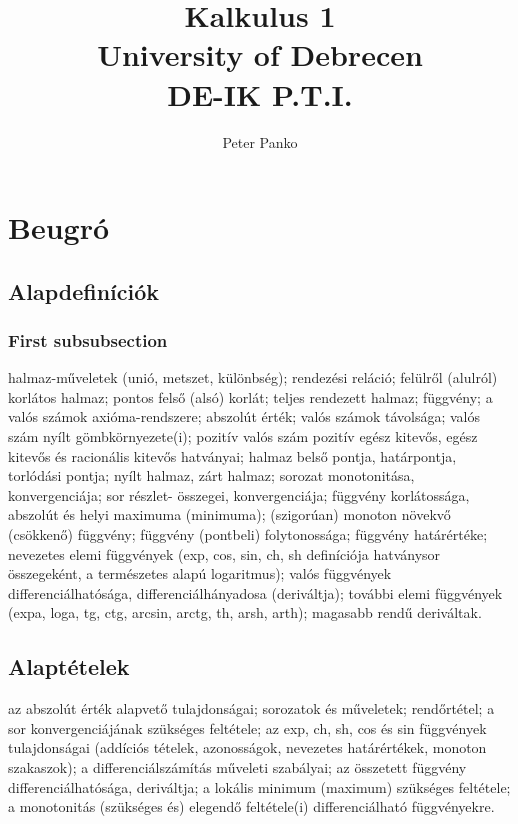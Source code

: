 \documentclass{article}
\title{\Huge Kalkulus 1 \\
\LARGE University of Debrecen \\
\large DE-IK P.T.I.}
\author{Peter Panko}
\date{ }
\begin{document}
\clearpage\maketitle
\thispagestyle{empty}

\newpage
\tableofcontents
\newpage


\section{Beugró}



\subsection{Alapdefiníciók}

\subsubsection{First subsubsection}
 
halmaz-műveletek (unió, metszet, különbség); rendezési reláció;
felülről (alulról) korlátos halmaz; pontos felső (alsó) korlát; teljes rendezett halmaz;
függvény; a valós számok axióma-rendszere; abszolút érték; valós számok távolsága;
valós szám nyílt gömbkörnyezete(i); pozitív valós szám pozitív egész kitevős, egész
kitevős és racionális kitevős hatványai; halmaz belső pontja, határpontja, torlódási
pontja; nyílt halmaz, zárt halmaz; sorozat monotonitása, konvergenciája; sor részlet-
összegei, konvergenciája; függvény korlátossága, abszolút és helyi maximuma
(minimuma); (szigorúan) monoton növekvő (csökkenő) függvény; függvény (pontbeli)
folytonossága; függvény határértéke; nevezetes elemi függvények (exp, cos, sin, ch, sh
definíciója hatványsor összegeként, a természetes alapú logaritmus); valós függvények
differenciálhatósága, differenciálhányadosa (deriváltja); további elemi függvények
(expa, loga, tg, ctg, arcsin, arctg, th, arsh, arth); magasabb rendű deriváltak.
 

 
\subsection{Alaptételek}
 
az abszolút érték alapvető tulajdonságai; sorozatok és műveletek; rendőrtétel;
a sor konvergenciájának szükséges feltétele; az exp, ch, sh, cos és sin függvények
tulajdonságai (addíciós tételek, azonosságok, nevezetes határértékek, monoton
szakaszok); a differenciálszámítás műveleti szabályai; az összetett függvény
differenciálhatósága, deriváltja; a lokális minimum (maximum) szükséges feltétele; a
monotonitás (szükséges és) elegendő feltétele(i) differenciálható függvényekre.
\end{document}

